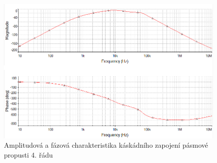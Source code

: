 \documentclass[twoside]{article}
\begin{document}
\begin{figure}[H]
\centering
\includegraphics[scale=0.75]{lrcbandpass4ampl.png}
\caption{Amplitudová a fázová charakteristika káskádního zapojení pásmové propusti 4. řádu}
\end{figure}
\newpage
\end{document}
